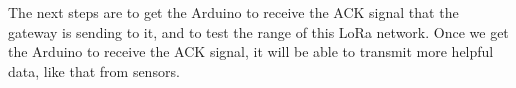 The next steps are to get the Arduino to receive the ACK signal that the gateway is sending to it, and to test the range of this LoRa network.
Once we get the Arduino to receive the ACK signal, it will be able to transmit more helpful data, like that from sensors.

